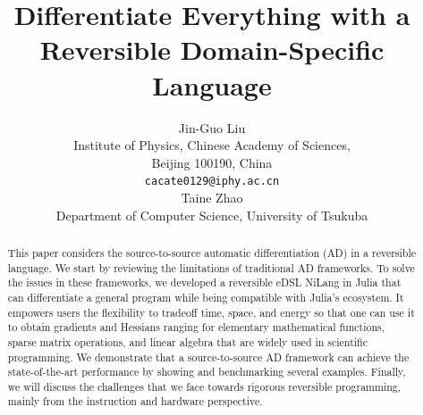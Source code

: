 \documentclass{article}
\newcommand{\<}{\langle}
\renewcommand{\>}{\rangle}
\theoremstyle{definition}\newtheorem{definition}{\textit{Definition}}
\begin{document}
\title{Differentiate Everything with a Reversible Domain-Specific Language}

\author{Jin-Guo Liu\\
Institute of Physics, Chinese Academy of Sciences,\\Beijing 100190, China\\
\texttt{cacate0129@iphy.ac.cn}\\
\And
Taine Zhao\\
Department of Computer Science, University of Tsukuba\\
}



\maketitle

\begin{abstract}
    This paper considers the source-to-source automatic differentiation (AD) in a reversible language. We start by reviewing the limitations of traditional AD frameworks. To solve the issues in these frameworks, we developed a reversible eDSL NiLang in Julia that can differentiate a general program while being compatible with Julia's ecosystem. It empowers users the flexibility to tradeoff time, space, and energy so that one can use it to obtain gradients and Hessians ranging for elementary mathematical functions, sparse matrix operations, and linear algebra that are widely used in scientific programming. We demonstrate that a source-to-source AD framework can achieve the state-of-the-art performance by showing and benchmarking several examples. Finally, we will discuss the challenges that we face towards rigorous reversible programming, mainly from the instruction and hardware perspective.
\end{abstract}

\end{document}
